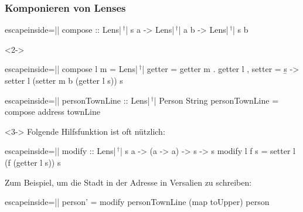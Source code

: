 \documentclass{beamer}
\newcommand{\kreuz}{$\,^\dag$} %
\begin{document}

\begin{frame}[fragile]
  \frametitle{Komponieren von Lenses}
\begin{haskellcode*}{escapeinside=||}
compose :: Lens|\kreuz| s a -> Lens|\kreuz| a b -> Lens|\kreuz| s b
\end{haskellcode*}
  \vspace{-12pt}
  \begin{visibleenv}<2->
\begin{haskellcode*}{escapeinside=||}
compose l m = Lens|\kreuz|
  { getter = getter m . getter l
  , setter = \b s -> setter l (setter m b (getter l s)) s
  }
\end{haskellcode*}
  \end{visibleenv}
\begin{haskellcode*}{escapeinside=||}
personTownLine :: Lens|\kreuz| Person String
personTownLine = compose address townLine
\end{haskellcode*}

\vspace{1em}

  \begin{visibleenv}<3->
    Folgende Hilfsfunktion ist oft nützlich:
\begin{haskellcode*}{escapeinside=||}
modify :: Lens|\kreuz| s a -> (a -> a) -> s -> s
modify l f s = setter l (f (getter l s)) s
\end{haskellcode*}
    Zum Beispiel, um die Stadt in der Adresse in Versalien zu schreiben:
\begin{haskellcode*}{escapeinside=||}
person' = modify personTownLine (map toUpper) person
\end{haskellcode*}
  \end{visibleenv}
\end{frame}
\end{document}
